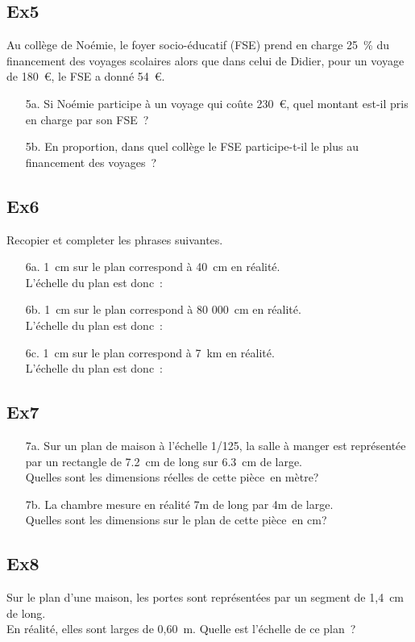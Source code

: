 \documentclass[12pt]{article}
\begin{document}
\begin{multicols}{2}
\subsection*{Ex5}
 Au collège de Noémie, le foyer socio-éducatif (FSE) prend en charge 25 \% du financement des voyages scolaires alors que dans celui de Didier, pour un voyage de 180 \euro, le FSE a donné 54 \euro.

\begin{itemize}
\item[5a.] Si Noémie participe à un voyage qui coûte 230 \euro, quel montant est-il pris en charge par son FSE ?
\item[5b.] En proportion, dans quel collège le FSE participe-t-il le plus au financement des voyages ?
\end{itemize}

\subsection*{Ex6}
Recopier et completer les phrases suivantes.
\begin{itemize}
\item[6a.] 1 cm sur le plan correspond à 40 cm en réalité.\\
L’échelle du plan est donc : 
\item[6b.] 1 cm sur le plan correspond à 80 000 cm en réalité. \\
L’échelle du plan est donc : 
\item[6c.] 1 cm sur le plan correspond à 7 km en réalité.\\
L’échelle du plan est donc : 
\end{itemize}
\end{multicols}
\begin{multicols}{2}
\subsection*{Ex7}
\begin{itemize}
\item[7a.] Sur un plan de maison à l’échelle 1/125, la salle à manger est représentée par un rectangle de 7.2 cm de long sur 6.3 cm de large. \\
Quelles sont les dimensions réelles de cette pièce en mètre?
\item[7b.] La chambre mesure en réalité 7m de long par 4m de large. \\
Quelles sont les dimensions sur le plan de cette pièce en cm?
\end{itemize}

\subsection*{Ex8}
Sur le plan d'une maison, les portes sont représentées par un segment de 1,4 cm de long. \\
En réalité, elles sont larges de 0,60 m. Quelle est l'échelle de ce plan ?
\end{multicols}
\end{document}
